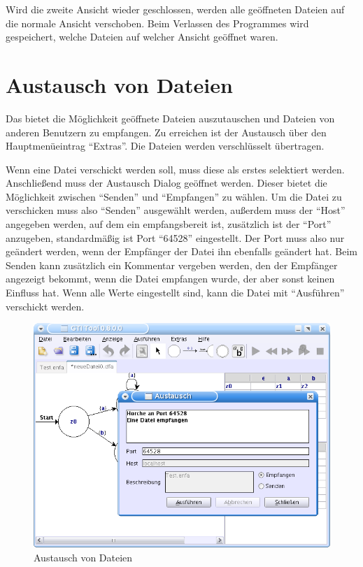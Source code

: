 Wird die zweite Ansicht wieder geschlossen, werden alle
geöffneten Dateien auf die normale Ansicht verschoben. Beim Verlassen des
Programmes wird gespeichert, welche Dateien auf welcher Ansicht geöffnet waren.


\section{Austausch von Dateien}

Das \gtitool bietet die Möglichkeit geöffnete Dateien auszutauschen und Dateien
von anderen \gtitool Benutzern zu empfangen. Zu erreichen ist der Austausch über
den Hauptmenüeintrag "`Extras"'. Die Dateien werden verschlüsselt
übertragen.\vspace{10pt}

Wenn eine Datei verschickt werden soll, muss diese als erstes selektiert werden.
Anschließend muss der Austausch Dialog geöffnet werden. Dieser bietet die
Möglichkeit zwischen "`Senden"' und "`Empfangen"' zu wählen. Um die Datei zu
verschicken muss also "`Senden"' ausgewählt werden, außerdem muss der "`Host"'
angegeben werden, auf dem ein \gtitool empfangsbereit ist, zusätzlich ist der
"`Port"' anzugeben, standardmäßig ist Port "`64528"' eingestellt. Der Port muss
also nur geändert werden, wenn der Empfänger der Datei ihn ebenfalls geändert
hat. Beim Senden kann zusätzlich ein Kommentar vergeben werden, den der Empfänger
angezeigt bekommt, wenn die Datei empfangen wurde, der aber sonst keinen
Einfluss hat. Wenn alle Werte eingestellt sind, kann die Datei mit
"`Ausführen"' verschickt werden.\vspace{10pt}

\begin{figure}[h]
\begin{center}
\includegraphics[width=12cm]{images/exchange.png}
\caption{Austausch von Dateien}
\end{center}
\end{figure}


